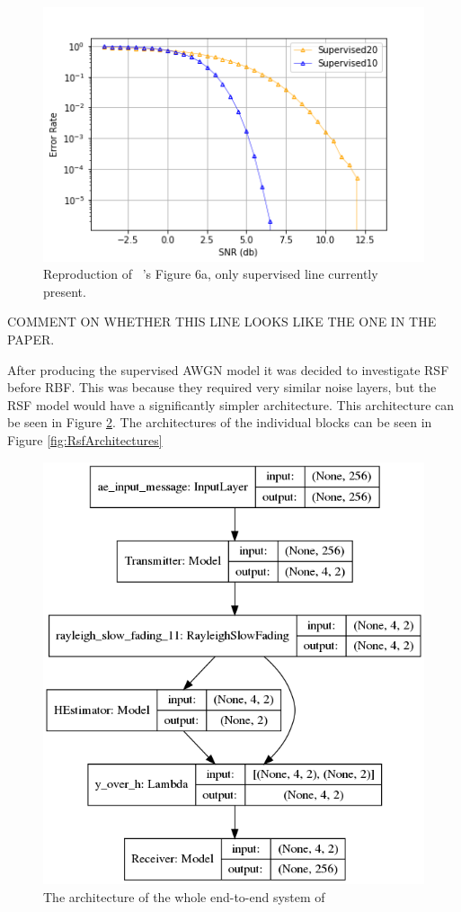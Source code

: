 \documentclass[12pt,onecolumn,letterpaper]{article}
\newcommand\genfigsize{0.5}
\begin{document}
\begin{figure}
   \centering
   \includegraphics[width=\genfigsize\linewidth]{figures/aoudia_paper/awgn_supervised.png}
   \caption{Reproduction of ~\cite{Aoudia}'s Figure 6a, only supervised line currently present.}
   \label{fig:AwgnSupervised}
\end{figure}

COMMENT ON WHETHER THIS LINE LOOKS LIKE THE ONE IN THE PAPER.

After producing the supervised AWGN model it was decided to investigate RSF before RBF. This was because they required very similar noise layers, but the RSF model would have a significantly simpler architecture. This architecture can be seen in Figure \ref{fig:RsfSupervisedArch}. The architectures of the individual blocks can be seen in Figure \ref{fig:RsfArchitectures}

\begin{figure}
   \centering
   \includegraphics[width=\genfigsize\linewidth]{figures/aoudia_paper/autoencoder_rsf_arch.png}
   \caption{The architecture of the whole end-to-end system of }
   \label{fig:RsfSupervisedArch}
\end{figure}
\end{document}
